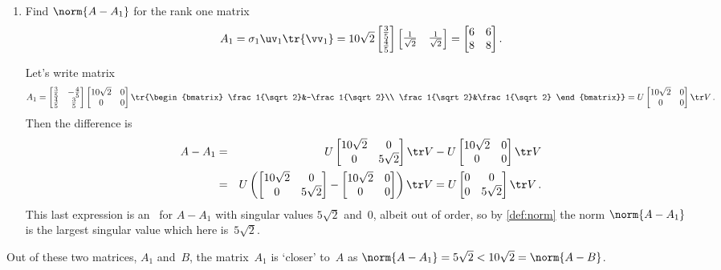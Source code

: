 \begin{example}
\begin{enumerate}
\begin{enumerate}
\item Find \(\norm{A-A_1}\) for the rank one matrix 
\begin{equation*}
A_1=\sigma_1\uv_1\tr{\vv_1}
=10\sqrt2\begin{bmatrix} \frac35\\\frac45 \end{bmatrix}
\begin{bmatrix} \frac1{\sqrt2}&\frac1{\sqrt2} \end{bmatrix}
=\begin{bmatrix} 6&6\\8&8 \end{bmatrix}.
\end{equation*}
\begin{solution} 
Let's write matrix
\begin{equation*}
A_1=\begin{bmatrix} \frac35&-\frac45\\\frac45&\frac35 \end{bmatrix}
\begin{bmatrix} 10\sqrt2&0\\0&0 \end{bmatrix}
\tr{\begin{bmatrix} \frac1{\sqrt2}&-\frac1{\sqrt2}\\ \frac1{\sqrt2}&\frac1{\sqrt2} \end{bmatrix}}
=U\begin{bmatrix} 10\sqrt2&0\\0&0 \end{bmatrix}\tr V\,.
\end{equation*}
Then the difference is
\begin{eqnarray*}
A-A_1&=&U\begin{bmatrix} 10\sqrt2&0\\0&5\sqrt2 \end{bmatrix}\tr V
-U\begin{bmatrix} 10\sqrt2&0\\0&0 \end{bmatrix}\tr V
\\&=&U\left(\begin{bmatrix} 10\sqrt2&0\\0&5\sqrt2 \end{bmatrix}
-\begin{bmatrix} 10\sqrt2&0\\0&0 \end{bmatrix}\right)\tr V
=U\begin{bmatrix} 0&0\\0&5\sqrt2 \end{bmatrix}\tr V\,.
\end{eqnarray*}
This last expression is an \svd\ for \(A-A_1\) with singular values \(5\sqrt2\) and~\(0\), albeit out of order, so by \cref{def:norm} the norm \(\norm{A-A_1}\) is the largest singular value which here is~\(5\sqrt2\).
\end{solution}
\end{enumerate}
Out of these two matrices, \(A_1\) and~\(B\), the matrix~\(A_1\) is `closer' to~\(A\) as \(\norm{A-A_1}=5\sqrt2<10\sqrt2=\norm{A-B}\).
\end{enumerate}
\end{example}
